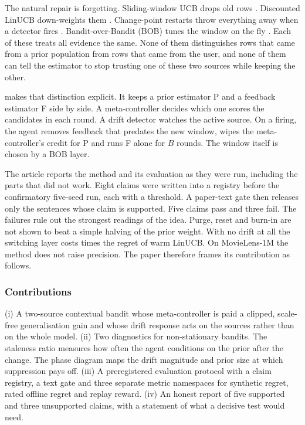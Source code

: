 The natural repair is forgetting. Sliding-window UCB drops old rows \cite{garivier2011}. Discounted LinUCB down-weights them \cite{russac2019}. Change-point restarts throw everything away when a detector fires \cite{liu2018}. Bandit-over-Bandit (BOB) tunes the window on the fly \cite{cheung2019}. Each of these treats all evidence the same. None of them distinguishes rows that came from a prior population from rows that came from the user, and none of them can tell the estimator to stop trusting one of these two sources while keeping the other.

\des{} makes that distinction explicit. It keeps a prior estimator P and a feedback estimator F side by side. A meta-controller decides which one scores the candidates in each round. A drift detector watches the active source. On a firing, the agent removes feedback that predates the new window, wipes the meta-controller's credit for P and runs F alone for $B$ rounds. The window itself is chosen by a BOB layer.

The article reports the method and its evaluation as they were run, including the parts that did not work. Eight claims were written into a registry before the confirmatory five-seed run, each with a threshold. A paper-text gate then releases only the sentences whose claim is supported. Five claims pass and three fail. The failures rule out the strongest readings of the idea. Purge, reset and burn-in are not shown to beat a simple halving of the prior weight. With no drift at all the switching layer costs \harmRatio{} times the regret of warm LinUCB. On MovieLens-1M the method does not raise precision. The paper therefore frames its contribution as follows.

\subsubsection*{Contributions}
(i) A two-source contextual bandit whose meta-controller is paid a clipped, scale-free generalisation gain and whose drift response acts on the sources rather than on the whole model.
(ii) Two diagnostics for non-stationary bandits. The staleness ratio measures how often the agent conditions on the prior after the change. The phase diagram maps the drift magnitude and prior size at which suppression pays off.
(iii) A preregistered evaluation protocol with a claim registry, a text gate and three separate metric namespaces for synthetic regret, rated offline regret and replay reward.
(iv) An honest report of five supported and three unsupported claims, with a statement of what a decisive test would need.

